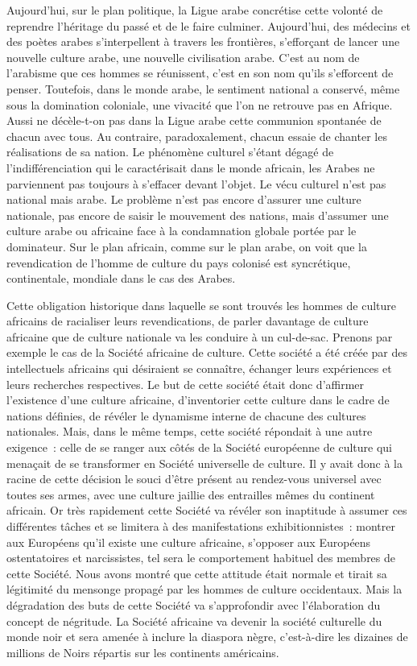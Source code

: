 \documentclass[french,twoside]{book} %
\begin{document}
\bigbreak
\noindent Aujourd’hui, sur le plan politique, la Ligue arabe concrétise cette volonté de reprendre l’héritage du passé et de le faire culminer. Aujourd’hui, des médecins et des poètes arabes s’interpellent à travers les frontières, s’efforçant de lancer une nouvelle culture arabe, une nouvelle civilisation arabe. C’est au nom de l’arabisme que ces hommes se réunissent, c’est en son nom qu’ils s’efforcent de penser. Toutefois, dans le monde arabe, le sentiment national a conservé, même sous la domination coloniale, une vivacité que l’on ne retrouve pas en Afrique. Aussi ne décèle-t-on pas dans la Ligue arabe cette communion spontanée de chacun avec tous. Au contraire, paradoxalement, chacun essaie de chanter les réalisations de sa nation. Le phénomène culturel s’étant dégagé de l’indifférenciation qui le caractérisait dans le monde africain, les Arabes ne parviennent pas toujours à s’effacer devant l’objet. Le vécu culturel n’est pas national mais arabe. Le problème n’est pas encore d’assurer une culture nationale, pas encore de saisir le mouvement des nations, mais d’assumer une culture arabe ou africaine face à la condamnation globale portée par le dominateur. Sur le plan africain, comme sur le plan arabe, on voit que la revendication de l’homme de culture du pays colonisé est syncrétique, continentale, mondiale dans le cas des Arabes.\par
\bigbreak
\noindent Cette obligation historique dans laquelle se sont trouvés les hommes de culture africains de racialiser leurs revendications, de parler davantage de culture africaine que de culture nationale va les conduire à un cul-de-sac. Prenons par exemple le cas de la Société africaine de culture. Cette société a été créée par des intellectuels africains qui désiraient se connaître, échanger leurs expériences et leurs recherches respectives. Le but de cette société était donc d’affirmer l’existence d’une culture africaine,   d’inventorier cette culture dans le cadre de nations définies, de révéler le dynamisme interne de chacune des cultures nationales. Mais, dans le même temps, cette société répondait à une autre exigence : celle de se ranger aux côtés de la Société européenne de culture qui menaçait de se transformer en Société universelle de culture. Il y avait donc à la racine de cette décision le souci d’être présent au rendez-vous universel avec toutes ses armes, avec une culture jaillie des entrailles mêmes du continent africain. Or très rapidement cette Société va révéler son inaptitude à assumer ces différentes tâches et se limitera à des manifestations exhibitionnistes : montrer aux Européens qu’il existe une culture africaine, s’opposer aux Européens ostentatoires et narcissistes, tel sera le comportement habituel des membres de cette Société. Nous avons montré que cette attitude était normale et tirait sa légitimité du mensonge propagé par les hommes de culture occidentaux. Mais la dégradation des buts de cette Société va s’approfondir avec l’élaboration du concept de négritude. La Société africaine va devenir la société culturelle du monde noir et sera amenée à inclure la diaspora nègre, c’est-à-dire les dizaines de millions de Noirs répartis sur les continents américains.\par
\end{document}
